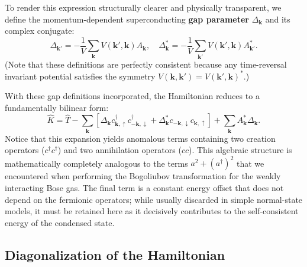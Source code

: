 To render this expression structurally clearer and physically transparent, we define the momentum-dependent superconducting \textbf{gap parameter} \( \Delta_{\mathbf{k}} \) and its complex conjugate:
\begin{equation} \label{eq:gap_definition}
    \Delta_{\mathbf{k}'} = - \frac{1}{V} \sum_{\mathbf{k}} V(\mathbf{k}', \mathbf{k}) A_{\mathbf{k}}, \quad \Delta_{\mathbf{k}}^* = - \frac{1}{V} \sum_{\mathbf{k}'} V(\mathbf{k}', \mathbf{k}) A_{\mathbf{k}'}^*.
\end{equation}
(Note that these definitions are perfectly consistent because any time-reversal invariant potential satisfies the symmetry \( V(\mathbf{k}, \mathbf{k}') = V(\mathbf{k}', \mathbf{k})^* \).)

With these gap definitions incorporated, the Hamiltonian reduces to a fundamentally bilinear form:
\[
    \hat{K} = \hat{T} - \sum_{\mathbf{k}} \left[ \Delta_{\mathbf{k}} c_{\mathbf{k},\uparrow}^\dagger c_{-\mathbf{k},\downarrow}^\dagger + \Delta_{\mathbf{k}}^* c_{-\mathbf{k},\downarrow} c_{\mathbf{k},\uparrow} \right] + \sum_{\mathbf{k}} A_{\mathbf{k}}^* \Delta_{\mathbf{k}}.
\]
Notice that this expansion yields anomalous terms containing two creation operators (\( c^\dagger c^\dagger \)) and two annihilation operators (\( cc \)). This algebraic structure is mathematically completely analogous to the terms \( a^2 + (a^\dagger)^2 \) that we encountered when performing the Bogoliubov transformation for the weakly interacting Bose gas. The final term is a constant energy offset that does not depend on the fermionic operators; while usually discarded in simple normal-state models, it must be retained here as it decisively contributes to the self-consistent energy of the condensed state.

\subsection{Diagonalization of the Hamiltonian}

